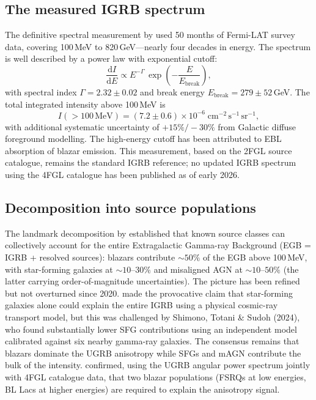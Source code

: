 \documentclass[10pt,a4paper]{article}
\begin{document}
\subsection{The measured IGRB spectrum}

The definitive spectral measurement by \citet{Ackermann2015} used 50 months of Fermi-LAT survey data, covering 100\,MeV to 820\,GeV---nearly four decades in energy. The spectrum is well described by a power law with exponential cutoff:
\begin{equation}
    \frac{\mathrm{d}I}{\mathrm{d}E} \propto E^{-\Gamma}\,\exp\!\left(-\frac{E}{E_{\mathrm{break}}}\right),
\end{equation}
with spectral index $\Gamma = 2.32 \pm 0.02$ and break energy $E_{\mathrm{break}} = 279 \pm 52$\,GeV. The total integrated intensity above 100\,MeV is
\begin{equation}
    I(>100\,\mathrm{MeV}) = (7.2 \pm 0.6)\times 10^{-6}\;\mathrm{cm^{-2}\,s^{-1}\,sr^{-1}},
\end{equation}
with additional systematic uncertainty of $+15\%/-30\%$ from Galactic diffuse foreground modelling. The high-energy cutoff has been attributed to EBL absorption of blazar emission. This measurement, based on the 2FGL source catalogue, remains the standard IGRB reference; no updated IGRB spectrum using the 4FGL catalogue has been published as of early 2026.

\subsection{Decomposition into source populations}

The landmark decomposition by \citet{Ajello2015comp} established that known source classes can collectively account for the entire Extragalactic Gamma-ray Background (EGB = IGRB + resolved sources): blazars contribute $\sim50\%$ of the EGB above 100\,MeV, with star-forming galaxies at $\sim10$--$30\%$ and misaligned AGN at $\sim10$--$50\%$ (the latter carrying order-of-magnitude uncertainties). The picture has been refined but not overturned since 2020. \citet{Roth2021} made the provocative claim that star-forming galaxies alone could explain the entire IGRB using a physical cosmic-ray transport model, but this was challenged by Shimono, Totani \& Sudoh (2024), who found substantially lower SFG contributions using an independent model calibrated against six nearby gamma-ray galaxies. The consensus remains that blazars dominate the UGRB anisotropy while SFGs and mAGN contribute the bulk of the intensity. \citet{Korsmeier2022} confirmed, using the UGRB angular power spectrum jointly with 4FGL catalogue data, that two blazar populations (FSRQs at low energies, BL Lacs at higher energies) are required to explain the anisotropy signal.
\end{document}
